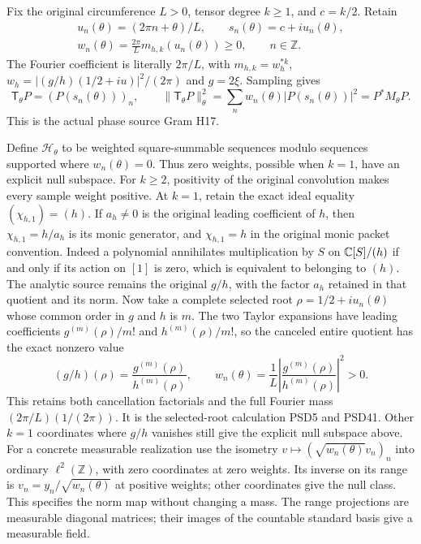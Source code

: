Fix the original circumference $L>0$, tensor degree $k\ge1$,
and $c=k/2$. Retain
\[
 \begin{gathered}
 u_n(\theta)=(2\pi n+\theta)/L,\qquad
 s_n(\theta)=c+iu_n(\theta),\\
 w_n(\theta)=\frac{2\pi}{L}m_{h,k}(u_n(\theta))\ge0,
 \qquad n\in\mathbb Z.
 \end{gathered}
 \tag{HCD17}
\]
The Fourier coefficient is literally $2\pi/L$, with
$m_{h,k}=w_h^{*k}$, $w_h=|(g/h)(1/2+iu)|^2/(2\pi)$
and $g=2\xi$. Sampling gives
\[
 \mathsf T_\theta P=(P(s_n(\theta)))_n,\qquad
 \|\mathsf T_\theta P\|_\theta^2
 =\sum_n w_n(\theta)|P(s_n(\theta))|^2=P^*M_\theta P.
 \tag{HCD18}
\]
This is the actual phase source Gram H17.

Define $\mathcal H_\theta$ to be weighted square-summable
sequences modulo sequences supported where $w_n(\theta)=0$.
Thus zero weights, possible when $k=1$, have an explicit
null subspace. For $k\ge2$, positivity of the original
convolution makes every sample weight positive.
At $k=1$, retain the exact ideal equality
$(\chi_{h,1})=(h)$. If $a_h\ne0$ is the original leading
coefficient of $h$, then $\chi_{h,1}=h/a_h$ is its monic
generator, and $\chi_{h,1}=h$ in the original monic packet
convention. Indeed a polynomial annihilates multiplication by
$S$ on $\mathbb C[S]/(h)$ if and only if its action on $[1]$ is
zero, which is equivalent to belonging to $(h)$.
The analytic source remains the original $g/h$, with
the factor $a_h$ retained in that quotient and its norm.
Now take a complete selected root
$\rho=1/2+iu_n(\theta)$ whose common order in $g$ and $h$
is $m$. The two Taylor expansions have leading coefficients
$g^{(m)}(\rho)/m!$ and $h^{(m)}(\rho)/m!$, so the canceled
entire quotient has the exact nonzero value
\[
 (g/h)(\rho)=\frac{g^{(m)}(\rho)}{h^{(m)}(\rho)},\qquad
 w_n(\theta)=\frac1L
 \left|\frac{g^{(m)}(\rho)}{h^{(m)}(\rho)}\right|^2>0.
 \tag{HCD18a}
\]
This retains both cancellation factorials and the full
Fourier mass $(2\pi/L)(1/(2\pi))$. It is the selected-root
calculation PSD5 and PSD41. Other $k=1$ coordinates where
$g/h$ vanishes still give the explicit null subspace above.
For a concrete measurable realization use the isometry
$v\mapsto(\sqrt{w_n(\theta)}v_n)_n$ into ordinary
$\ell^2(\mathbb Z)$, with zero coordinates at zero weights.
Its inverse on its range is
$v_n=y_n/\sqrt{w_n(\theta)}$ at positive weights; other
coordinates give the null class. This specifies the norm
map without changing a mass. The range projections are
measurable diagonal matrices; their images of the countable
standard basis give a measurable field.

